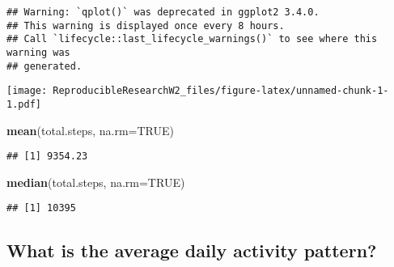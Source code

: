 \documentclass[
]{article}
\newenvironment{Shaded}{\begin{snugshade}}{\end{snugshade}}
\newcommand{\AttributeTok}[1]{\textcolor[rgb]{0.13,0.29,0.53}{#1}}
\newcommand{\ConstantTok}[1]{\textcolor[rgb]{0.56,0.35,0.01}{#1}}
\newcommand{\FunctionTok}[1]{\textcolor[rgb]{0.13,0.29,0.53}{\textbf{#1}}}
\newcommand{\NormalTok}[1]{#1}
\newcommand{\OtherTok}[1]{\textcolor[rgb]{0.56,0.35,0.01}{#1}}
\newcommand{\SpecialCharTok}[1]{\textcolor[rgb]{0.81,0.36,0.00}{\textbf{#1}}}
\newcommand{\StringTok}[1]{\textcolor[rgb]{0.31,0.60,0.02}{#1}}
\begin{document}
\begin{verbatim}
## Warning: `qplot()` was deprecated in ggplot2 3.4.0.
## This warning is displayed once every 8 hours.
## Call `lifecycle::last_lifecycle_warnings()` to see where this warning was
## generated.
\end{verbatim}

\texttt{[image: ReproducibleResearchW2\_files/figure-latex/unnamed-chunk-1-1.pdf]}

\begin{Shaded}
\begin{Highlighting}[]
\FunctionTok{mean}\NormalTok{(total.steps, }\AttributeTok{na.rm=}\ConstantTok{TRUE}\NormalTok{)}
\end{Highlighting}
\end{Shaded}

\begin{verbatim}
## [1] 9354.23
\end{verbatim}

\begin{Shaded}
\begin{Highlighting}[]
\FunctionTok{median}\NormalTok{(total.steps, }\AttributeTok{na.rm=}\ConstantTok{TRUE}\NormalTok{)}
\end{Highlighting}
\end{Shaded}

\begin{verbatim}
## [1] 10395
\end{verbatim}

\subsection{What is the average daily activity
pattern?}\label{what-is-the-average-daily-activity-pattern}

\begin{Shaded}
\end{Shaded}
\end{document}

